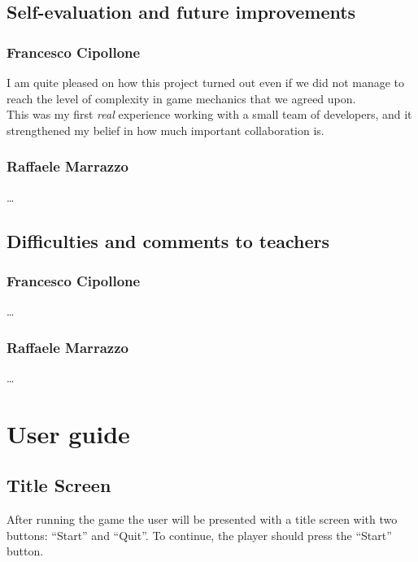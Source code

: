 \documentclass[12pt, a4paper]{report}
\theoremstyle{definition}
\begin{document}
\section{Self-evaluation and future improvements}

    \subsection*{Francesco Cipollone}

    I am quite pleased on how this project turned out even if we did not manage to reach the level of complexity in game mechanics that we agreed upon.\\
    This was my first \textit{real} experience working with a small team of developers, and it strengthened my belief in how much important collaboration is.

    \subsection*{Raffaele Marrazzo}

    \dots

\section{Difficulties and comments to teachers}

    \subsection*{Francesco Cipollone}

    \dots

    \subsection*{Raffaele Marrazzo}

    \dots

\appendix

\chapter{User guide}

\section{Title Screen}
After running the game the user will be presented with a title screen with two buttons: ``Start'' and ``Quit''. To continue, the player should press the ``Start'' button.
\end{document}
